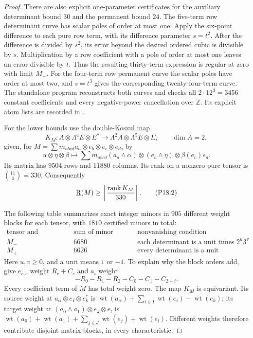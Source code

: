 \begin{proof}
There are also explicit one-parameter certificates
for the auxiliary determinant bound $30$ and the
permanent bound $24$.
The five-term row determinant curve has scalar poles
of order at most one. Apply the six-point difference
to each pure row term, with its difference parameter
$s=t^2$. After the difference is divided by $s^2$,
its error beyond the desired ordered cubic is divisible
by $s$. Multiplication by a row coefficient with a pole
of order at most one leaves an error divisible by $t$.
Thus the resulting thirty-term expression is regular
at zero with limit $M_-$. For the four-term row permanent
curve the scalar poles have order at most two, and
$s=t^3$ gives the corresponding twenty-four-term curve.
The standalone program
 reconstructs both
curves and checks all $2\cdot12^3=3456$ constant
coefficients and every negative-power cancellation over
$\mathbb Z$. Its explicit atom lists are recorded in
.

For the lower bounds use the double-Koszul map
\[
 K_M:A\otimes\Lambda^4E\otimes E^*
 \longrightarrow\Lambda^2A\otimes\Lambda^5E\otimes E,
 \qquad \dim A=2,
\]
given, for $M=\sum m_{a b c d}a_a\otimes e_b\otimes e_c\otimes e_d$, by
\[
 \alpha\otimes\eta\otimes\beta
 \longmapsto\sum m_{a b c d}
 (a_a\wedge\alpha)\otimes(e_b\wedge\eta)
                       \otimes\beta(e_c)e_d.
\]
Its matrix has $9504$ rows and $11880$ columns. Its rank
on a nonzero pure tensor is
$\binom{11}{4}=330$. Consequently
\[
 \underline{\mathrm R}(M)\geq\left\lceil\frac{\operatorname{rank} K_M}{330}\right\rceil.
 \tag{P18.2}
\]

The following table summarizes exact integer minors
in $905$ different weight blocks for each tensor,
with $1810$ certified minors in total:
\[
\begin{array}{c|r|l}
\text{tensor and certificate}&\text{sum of minor orders}
 &\text{nonvanishing condition}\\\hline
M_-&6680&\text{each determinant is a unit times }2^u3^v\\
M_+&6626&\text{every determinant is a unit}
\end{array}
\]
Here $u,v\geq0$, and a unit means $1$ or $-1$.
To explain why the block orders add, give $e_{r,c}$
weight $R_r+C_c$ and $a_i$ weight
\[
 -R_0-R_1-R_2-C_0-C_1-C_{2+i}.
\]
Every coefficient term of $M$ has total weight zero.
The map $K_M$ is equivariant. Its source weight at
$a_\alpha\otimes e_I\otimes e_k^*$ is
$\operatorname{wt}(a_\alpha)+\sum_{i\in I}\operatorname{wt}(e_i)
-\operatorname{wt}(e_k)$; its target weight at
$(a_0\wedge a_1)\otimes e_J\otimes e_l$ is
$\operatorname{wt}(a_0)+\operatorname{wt}(a_1)
+\sum_{j\in J}\operatorname{wt}(e_j)+\operatorname{wt}(e_l)$.
Different weights therefore contribute disjoint matrix
blocks, in every characteristic.


\end{proof}
